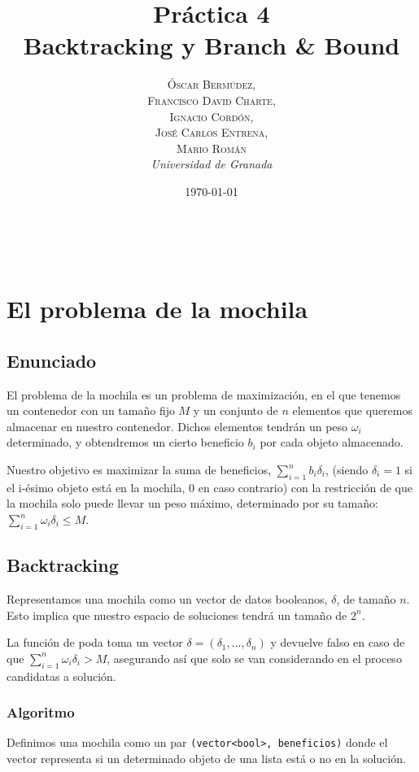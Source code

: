 \documentclass[a4paper, 11pt]{article} %
\title{\textbf{Práctica 4}\\ %
Backtracking y Branch \& Bound} %
\author{\textsc{Óscar Bermúdez,\\Francisco David Charte,\\Ignacio Cordón,\\José Carlos Entrena,\\Mario Román} %
\\{\textit{Universidad de Granada}}} %
\date{\today} %
\makeatletter
\renewcommand{\maketitle}{ %
\begin{flushright} %
{\LARGE\@title} %

\vspace{50pt} %

{\large\@author} %
\\\@date %

\vspace{40pt} %
\end{flushright}
}
\makeatother
\begin{document}
\maketitle %

\renewcommand{\abstractname}{Resumen} %
\begin{abstract}
\end{abstract}
{\parskip=2pt
\tableofcontents
}
\pagebreak


\section{El problema de la mochila}

\subsection{Enunciado}
El problema de la mochila es un problema de maximización, en el que tenemos un contenedor con un tamaño 
fijo $M$ y un conjunto de $n$ elementos que queremos almacenar en nuestro contenedor. Dichos elementos tendrán un peso $\omega_i$
determinado, y obtendremos un cierto beneficio $b_i$ por cada objeto almacenado.

Nuestro objetivo es maximizar la suma de beneficios, $\sum_{i=1}^{n} b_i\delta_i$, (siendo $\delta_i = 1$ si el i-ésimo objeto está en la mochila, 0 en caso contrario) con la restricción de que la mochila solo puede llevar un peso máximo, determinado por su tamaño: $\sum_{i=1}^{n} \omega_i\delta_i \leq M$.

  
    \subsection{Backtracking}
Representamos una mochila como un vector de datos booleanos, $\delta$, de tamaño $n$. Esto implica que nuestro espacio de soluciones tendrá un tamaño de $2^n$.

La función de poda toma un vector $\delta = (\delta_1, \dots, \delta_n)$ y devuelve falso en caso de que $\sum_{i=1}^{n} \omega_i\delta_i > M$, asegurando así que solo se van considerando en el proceso candidatas a solución.


	\subsubsection{Algoritmo}

Definimos una mochila como un par \texttt{(vector<bool>, beneficios)} donde el vector representa si un determinado objeto de una lista está o no en la solución.
\end{document}
